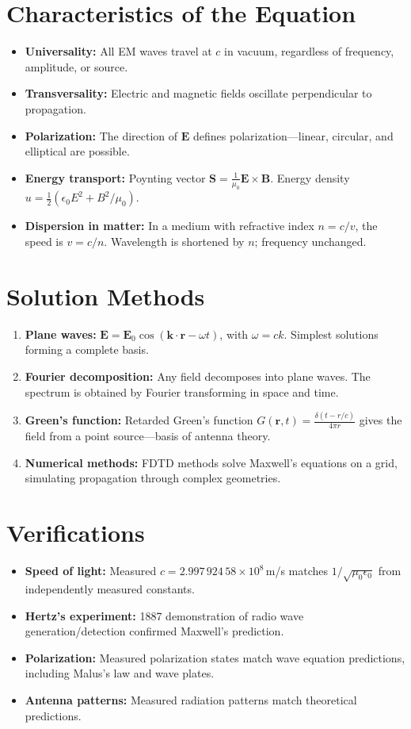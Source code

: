 \section*{Characteristics of the Equation}

\begin{itemize}
\item \textbf{Universality:} All EM waves travel at $c$ in vacuum, regardless of frequency, amplitude, or source.
\item \textbf{Transversality:} Electric and magnetic fields oscillate perpendicular to propagation.
\item \textbf{Polarization:} The direction of $\mathbf{E}$ defines polarization---linear, circular, and elliptical are possible.
\item \textbf{Energy transport:} Poynting vector $\mathbf{S} = \frac{1}{\mu_0}\mathbf{E} \times \mathbf{B}$. Energy density $u = \frac{1}{2}(\epsilon_0 E^2 + B^2/\mu_0)$.
\item \textbf{Dispersion in matter:} In a medium with refractive index $n = c/v$, the speed is $v = c/n$. Wavelength is shortened by $n$; frequency unchanged.
\end{itemize}
\section*{Solution Methods}

\begin{enumerate}
\item \textbf{Plane waves:} $\mathbf{E} = \mathbf{E}_0 \cos(\mathbf{k} \cdot \mathbf{r} - \omega t)$, with $\omega = ck$. Simplest solutions forming a complete basis.
\item \textbf{Fourier decomposition:} Any field decomposes into plane waves. The spectrum is obtained by Fourier transforming in space and time.
\item \textbf{Green's function:} Retarded Green's function $G(\mathbf{r}, t) = \frac{\delta(t - r/c)}{4\pi r}$ gives the field from a point source---basis of antenna theory.
\item \textbf{Numerical methods:} FDTD methods solve Maxwell's equations on a grid, simulating propagation through complex geometries.
\end{enumerate}
\section*{Verifications}

\begin{itemize}
\item \textbf{Speed of light:} Measured $c = 2.997\,924\,58 \times 10^8$\,m/s matches $1/\sqrt{\mu_0 \epsilon_0}$ from independently measured constants.
\item \textbf{Hertz's experiment:} 1887 demonstration of radio wave generation/detection confirmed Maxwell's prediction.
\item \textbf{Polarization:} Measured polarization states match wave equation predictions, including Malus's law and wave plates.
\item \textbf{Antenna patterns:} Measured radiation patterns match theoretical predictions.
\end{itemize}
